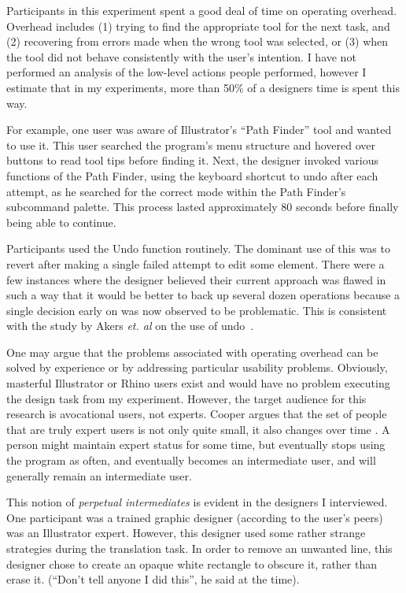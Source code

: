 \documentclass[12pt]{article}
\begin{document}
Participants in this experiment spent a good deal of time on operating
overhead. Overhead includes (1) trying to find the appropriate tool
for the next task, and (2) recovering from errors made when the wrong
tool was selected, or (3) when the tool did not behave consistently
with the user's intention. I have not performed an analysis of the
low-level actions people performed, however I estimate that in my
experiments, more than 50\% of a designers time is spent this way.

For example, one user was aware of Illustrator's ``Path Finder'' tool
and wanted to use it. This user searched the program's menu structure
and hovered over buttons to read tool tips before finding it. Next,
the designer invoked various functions of the Path Finder, using the
keyboard shortcut to undo after each attempt, as he searched for the
correct mode within the Path Finder's subcommand palette. This process
lasted approximately 80 seconds before finally being able to continue.

Participants used the Undo function routinely. The dominant use of
this was to revert after making a single failed attempt to edit some
element. There were a few instances where the designer believed their
current approach was flawed in such a way that it would be better to
back up several dozen operations because a single decision early on
was now observed to be problematic. This is consistent with the study
by Akers \textit{et. al} on the use of undo~\cite{akers-undo}.

One may argue that the problems associated with operating overhead can
be solved by experience or by addressing particular usability
problems. Obviously, masterful Illustrator or Rhino users exist and
would have no problem executing the design task from my
experiment. However, the target audience for this research is
avocational users, not experts. Cooper argues that the set of people
that are truly expert users is not only quite small, it also changes
over time \cite{cooper-inmates}. A person might maintain expert status
for some time, but eventually stops using the program as often, and
eventually becomes an intermediate user, and will generally remain an
intermediate user.

This notion of \textit{perpetual intermediates} is evident in the
designers I interviewed. One participant was a trained graphic
designer (according to the user's peers) was an Illustrator
expert. However, this designer used some rather strange strategies
during the translation task. In order to remove an unwanted line, this
designer chose to create an opaque white rectangle to obscure it,
rather than erase it. (``Don't tell anyone I did this'', he said at
the time).
\end{document}

